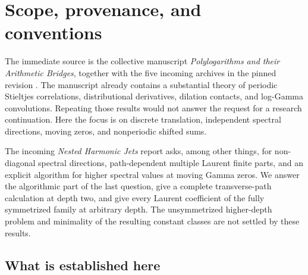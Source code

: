 \section{Scope, provenance, and conventions}\label{sec:scope}

The immediate source is the collective manuscript \emph{Polylogarithms and
their Arithmetic Bridges}, together with the five incoming archives in the
pinned revision \cite{repo,nested,gauss,mellin,stharm,translation}. The
manuscript already contains a substantial theory of periodic Stieltjes
correlations, distributional derivatives, dilation contacts, and
log-Gamma convolutions. Repeating those results would not answer the
request for a research continuation. Here the focus is on discrete
translation, independent spectral directions, moving zeros, and
nonperiodic shifted sums.

The incoming \emph{Nested Harmonic Jets} report asks, among other things,
for non-diagonal spectral directions, path-dependent multiple Laurent
finite parts, and an explicit algorithm for higher spectral values at
moving Gamma zeros. We answer the algorithmic part of the last question,
give a complete transverse-path calculation at depth two, and give every
Laurent coefficient of the fully symmetrized family at arbitrary depth.
The unsymmetrized higher-depth problem and minimality of the resulting
constant classes are not settled by these results.

\subsection{What is established here}

